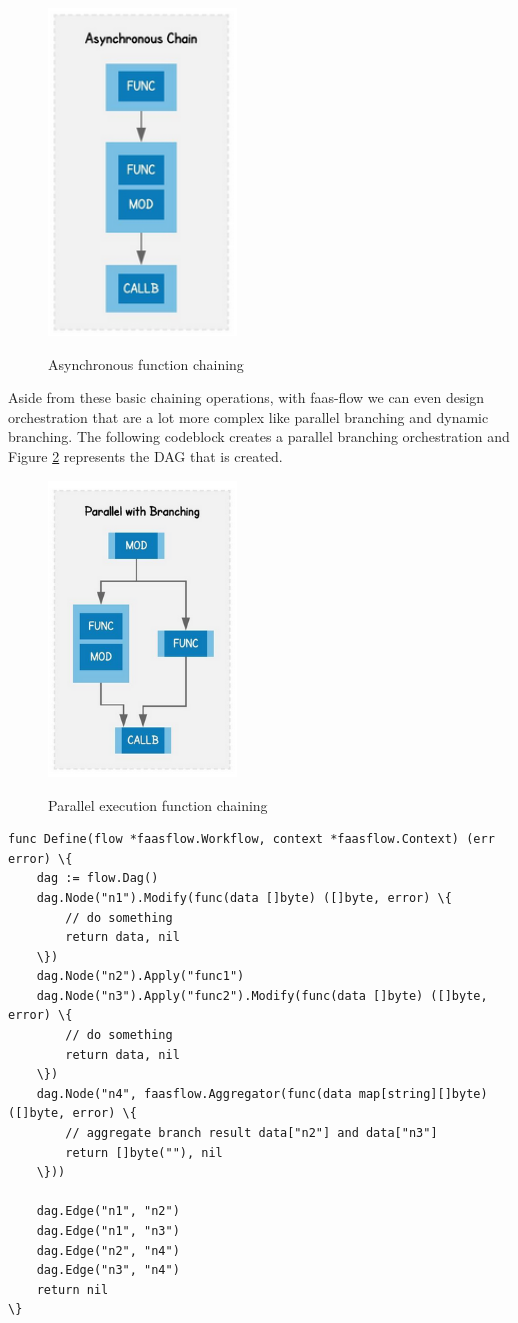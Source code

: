 \documentclass[12pt,titlepage]{article}
\begin{document}
\begin{figure}[!h]
    \caption{Asynchronous function chaining}
    \centering
    \includegraphics[width=50mm]{./thesis_images/asynchronous.png}
    \label{fig:asynchronous}
\end{figure}

Aside from these basic chaining operations, with faas-flow we can even design
orchestration that are a lot more complex like parallel branching and dynamic
branching. The following codeblock creates a parallel branching orchestration
and Figure \ref{fig:parallel} represents the DAG that is created.

\begin{figure}[!h]
    \caption{Parallel execution function chaining}
    \centering
    \includegraphics[width=50mm]{./thesis_images/parallel.png}
    \label{fig:parallel}
\end{figure}
\begin{lstlisting}
func Define(flow *faasflow.Workflow, context *faasflow.Context) (err error) \{
    dag := flow.Dag()
    dag.Node("n1").Modify(func(data []byte) ([]byte, error) \{
        // do something
        return data, nil
    \})
    dag.Node("n2").Apply("func1")
    dag.Node("n3").Apply("func2").Modify(func(data []byte) ([]byte, error) \{
        // do something
        return data, nil
    \})
    dag.Node("n4", faasflow.Aggregator(func(data map[string][]byte) ([]byte, error) \{
        // aggregate branch result data["n2"] and data["n3"]
        return []byte(""), nil
    \}))

    dag.Edge("n1", "n2")
    dag.Edge("n1", "n3")
    dag.Edge("n2", "n4")
    dag.Edge("n3", "n4")
    return nil
\}
\end{lstlisting}
\end{document}
